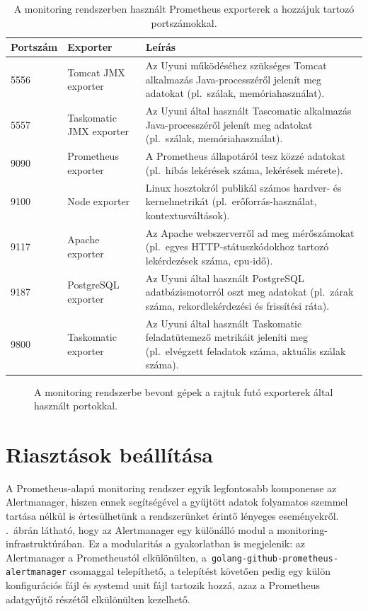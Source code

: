 \begin{table}[h]
	\setlength{\tabcolsep}{5pt}
	\renewcommand{\arraystretch}{1.3}
	\centering
	\begin{tabular}{||l l m{7.6cm}||}
		\hline
		Portszám & Exporter & Leírás \\
		\hline\hline
		5556 & Tomcat JMX exporter & Az Uyuni működéséhez szükséges Tomcat alkalmazás Java-processzéről jelenít meg adatokat (pl.~szálak, memóriahasználat). \\
		\hline
		5557 & Taskomatic JMX exporter & Az Uyuni által használt Tascomatic alkalmazás Java-processzéről jelenít meg adatokat (pl.~szálak, memóriahasználat). \\
		\hline
		9090 & Prometheus exporter & A Prometheus állapotáról tesz közzé adatokat (pl.~hibás lekérések száma, lekérések mérete).  \\
		\hline
		9100 & Node exporter & Linux hosztokról publikál számos hardver- és kernelmetrikát (pl.~erőforrás-használat, kontextusváltások). \\
		\hline
		9117 & Apache exporter & Az Apache webszerverről ad meg mérőszámokat (pl.~egyes HTTP-státuszkódokhoz tartozó lekérdezések száma, \acrshort{cpu}-idő).  \\
		\hline
		9187 & PostgreSQL exporter & Az Uyuni által használt PostgreSQL adatbázismotorról oszt meg adatokat (pl.~zárak száma, rekordlekérdezési és frissítési ráta).  \\
		\hline
		9800 & Taskomatic exporter & Az Uyuni által használt Taskomatic feladatütemező metrikáit jeleníti meg (pl.~elvégzett feladatok száma, aktuális szálak száma).  \\
		\hline
	\end{tabular}
	\caption{A monitoring rendszerben használt Prometheus exporterek a hozzájuk tartozó portszámokkal.}
	\label{tab:monitoring-exporters}
\end{table}

\begin{figure}[ht]
	\centering
	
	\caption{A monitoring rendszerbe bevont gépek a rajtuk futó exporterek által használt portokkal.}
	\label{fig:monitoring-setup}
\end{figure}

\section{Riasztások beállítása}
A Prometheus-alapú monitoring rendszer egyik legfontosabb komponense az Alertmanager, hiszen ennek segítségével a gyűjtött adatok folyamatos szemmel tartása nélkül is értesülhetünk a rendszerünket érintő lényeges eseményekről.
.~ábrán látható, hogy az Alertmanager egy különálló modul a monitoring-infrastruktúrában. Ez a modularitás a gyakorlatban is megjelenik: az Alertmanager a Prometheustól elkülönülten, a~\texttt{golang-github-prometheus-alertmanager} csomaggal telepíthető, a telepítést követően pedig egy külön konfigurációs fájl és systemd unit fájl tartozik hozzá, azaz a Prometheus adatgyűjtő részétől elkülönülten kezelhető.

